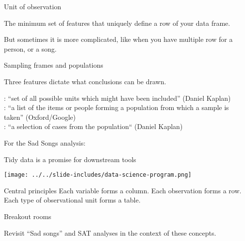 \documentclass[table]{beamer}\usepackage[]{graphicx}\usepackage[]{color}
\begin{document}

\begin{frame}{Unit of observation}

The minimum set of features that uniquely define a row of your data frame.

\vspace{4em}

But sometimes it is more complicated, like when you have multiple row for a person, or a song.

\end{frame}



\begin{frame}{Sampling frames and populations}

\begin{block}{Three features dictate what conclusions can be drawn.}

\bi
{}: ``set of all possible units which might have been included'' (Daniel Kaplan)\\
: ``a list of the items or people forming a population from which a sample is taken'' (Oxford/Google) \\
: ``a selection of cases from the population`` (Daniel Kaplan)
\ei

\end{block}

For the Sad Songs analysis:



\end{frame}



\begin{frame}[fragile]{Tidy data is a promise for downstream tools}


\begin{center}
\texttt{[image: ../../slide-includes/data-science-program.png]}
\end{center}

\vspace{2em}

\begin{block}{Central principles}
\bi
	\myitem Each variable forms a column.
	\myitem Each observation forms a row.
	\myitem Each type of observational unit forms a table.
\ei
\end{block}



\end{frame}



\begin{frame}[fragile]{Breakout rooms}


\begin{block}{Revisit ``Sad songs'' and SAT analyses in the context of these concepts.}
\end{block}

\end{frame}
\end{document}

